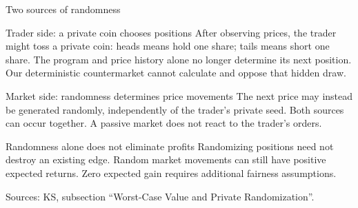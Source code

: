 \documentclass{beamer}
\newcommand{\sourcefoot}[1]{%
  \par\vfill{\fontsize{6.3}{7.5}\selectfont\color{black!65}Sources: #1\par}}
\begin{document}
\begin{frame}{Two sources of randomness}
\small
\begin{block}{Trader side: a private coin chooses positions}
After observing prices, the trader might toss a private coin:
heads means hold one share; tails means short one share.
The program and price history alone no longer determine its next position.
Our deterministic countermarket cannot calculate and oppose that hidden draw.
\end{block}
\begin{exampleblock}{Market side: randomness determines price movements}
The next price may instead be generated randomly, independently of
the trader's private seed. Both sources can occur together.
A passive market does not react to the trader's orders.
\end{exampleblock}
\begin{alertblock}{Randomness alone does not eliminate profits}
Randomizing positions need not destroy an existing edge.
Random market movements can still have positive expected returns.
Zero expected gain requires additional fairness assumptions.
\end{alertblock}
\sourcefoot{KS, subsection \enquote{Worst-Case Value and Private Randomization}.}
\end{frame}
\end{document}
